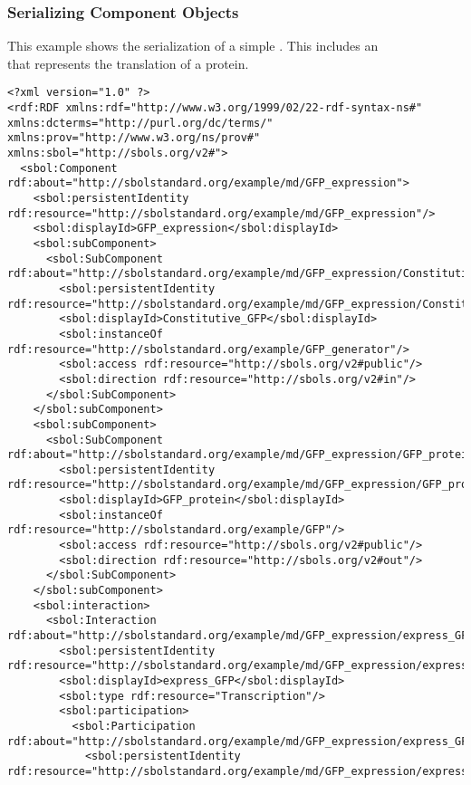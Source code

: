 \subsubsection{Serializing Component Objects}
This example shows the serialization of a simple . This  includes an\\
 that represents the translation of a protein.
\begin{lstlisting}
<?xml version="1.0" ?>
<rdf:RDF xmlns:rdf="http://www.w3.org/1999/02/22-rdf-syntax-ns#" xmlns:dcterms="http://purl.org/dc/terms/" xmlns:prov="http://www.w3.org/ns/prov#" xmlns:sbol="http://sbols.org/v2#">
  <sbol:Component rdf:about="http://sbolstandard.org/example/md/GFP_expression">
    <sbol:persistentIdentity rdf:resource="http://sbolstandard.org/example/md/GFP_expression"/>
    <sbol:displayId>GFP_expression</sbol:displayId>
    <sbol:subComponent>
      <sbol:SubComponent rdf:about="http://sbolstandard.org/example/md/GFP_expression/Constitutive_GFP">
        <sbol:persistentIdentity rdf:resource="http://sbolstandard.org/example/md/GFP_expression/Constitutive_GFP"/>
        <sbol:displayId>Constitutive_GFP</sbol:displayId>
        <sbol:instanceOf rdf:resource="http://sbolstandard.org/example/GFP_generator"/>
        <sbol:access rdf:resource="http://sbols.org/v2#public"/>
        <sbol:direction rdf:resource="http://sbols.org/v2#in"/>
      </sbol:SubComponent>
    </sbol:subComponent>
    <sbol:subComponent>
      <sbol:SubComponent rdf:about="http://sbolstandard.org/example/md/GFP_expression/GFP_protein">
        <sbol:persistentIdentity rdf:resource="http://sbolstandard.org/example/md/GFP_expression/GFP_protein"/>
        <sbol:displayId>GFP_protein</sbol:displayId>
        <sbol:instanceOf rdf:resource="http://sbolstandard.org/example/GFP"/>
        <sbol:access rdf:resource="http://sbols.org/v2#public"/>
        <sbol:direction rdf:resource="http://sbols.org/v2#out"/>
      </sbol:SubComponent>
    </sbol:subComponent>
    <sbol:interaction>
      <sbol:Interaction rdf:about="http://sbolstandard.org/example/md/GFP_expression/express_GFP">
        <sbol:persistentIdentity rdf:resource="http://sbolstandard.org/example/md/GFP_expression/express_GFP"/>
        <sbol:displayId>express_GFP</sbol:displayId>
        <sbol:type rdf:resource="Transcription"/>
        <sbol:participation>
          <sbol:Participation rdf:about="http://sbolstandard.org/example/md/GFP_expression/express_GFP/Protein">
            <sbol:persistentIdentity rdf:resource="http://sbolstandard.org/example/md/GFP_expression/express_GFP/Protein"/>

\end{lstlisting}
